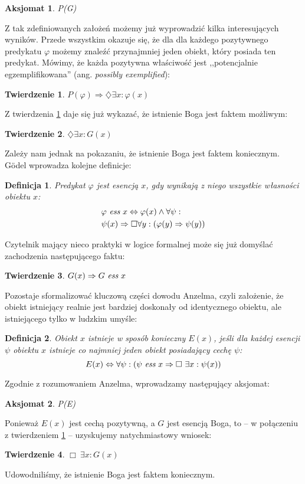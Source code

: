 \documentclass{eiti-raport}
\newtheorem{theorem}{Twierdzenie}
\newtheorem{definition}{Definicja}
\newtheorem{axiom}{Aksjomat}
\begin{document}
\begin{axiom} \label{axiom:godel4}
	P(G)
\end{axiom}
\noindent Z tak zdefiniowanych założeń możemy już wyprowadzić kilka interesujących wyników. Przede wszystkim okazuje się, że dla dla każdego pozytywnego predykatu $\varphi$ możemy znaleźć przynajmniej jeden obiekt, który posiada ten predykat. Mówimy, że każda pozytywna właściwość jest ,,potencjalnie egzemplifikowana'' (ang. \emph{possibly exemplified}):
\begin{theorem} \label{th:godel1}
	$P(\varphi) \Rightarrow \diamondsuit \exists x: \varphi(x)$
\end{theorem}
\noindent Z twierdzenia \ref{th:godel1} daje się już wykazać, że istnienie Boga jest faktem możliwym:
\begin{theorem} \label{th:godel2}
	$\diamondsuit \exists x: G(x)$
\end{theorem}
\noindent Zależy nam jednak na pokazaniu, że istnienie Boga jest faktem koniecznym. G\"odel wprowadza kolejne definicje:
\begin{definition}
	Predykat $\varphi$ jest \emph{esencją} $x$, gdy wynikają z niego wszystkie własności obiektu $x$:
	\begin{align*}
		& \varphi\ \emph{ess}\ x \Leftrightarrow \varphi(x) \wedge \forall \psi: \\ 
		& \psi(x) \Rightarrow \Box \forall y: \left( \varphi(y) \Rightarrow \psi(y) \right)
	\end{align*}
\end{definition}
\noindent Czytelnik mający nieco praktyki w logice formalnej może się już domyślać zachodzenia następującego faktu:
\begin{theorem}
	$G(x) \Rightarrow G\ \emph{ess}\ x$
\end{theorem}
\noindent Pozostaje sformalizować kluczową części dowodu Anzelma, czyli założenie, że obiekt istniejący realnie jest bardziej doskonały od identycznego obiektu, ale istniejącego tylko w ludzkim umyśle: 
\begin{definition}
	Obiekt $x$ istnieje w sposób konieczny $E(x)$, jeśli dla każdej esencji $\psi$ obiektu $x$ istnieje co najmniej jeden obiekt posiadający cechę $\psi$:
	\begin{equation*}
		E(x) \Leftrightarrow \forall \psi: \left( \psi\ \emph{ess}\ x \Rightarrow\Box\ \exists x: \psi(x) \right)
	\end{equation*}
\end{definition}
\noindent Zgodnie z rozumowaniem Anzelma, wprowadzamy następujący aksjomat:
\begin{axiom}
	P(E)
\end{axiom}
\noindent Ponieważ $E(x)$ jest cechą pozytywną, a $G$ jest esencją Boga, to -- w połączeniu z twierdzeniem \ref{th:godel1} -- uzyskujemy natychmiastowy wniosek:
\begin{theorem} \label{th:goedel3}
	$\Box\ \exists x: G(x)$
\end{theorem}
\noindent Udowodniliśmy, że istnienie Boga jest faktem koniecznym.
\end{document}
